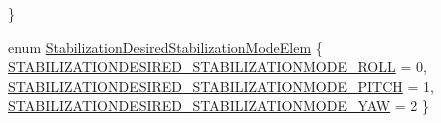 \begin{DoxyCompactItemize}
 \}
\item 
enum \hyperlink{group___stabilization_desired_gab5327ad9058cb809514e48b3600d11df}{\-Stabilization\-Desired\-Stabilization\-Mode\-Elem} \{ \hyperlink{group___stabilization_desired_ggab5327ad9058cb809514e48b3600d11dfac296a07cf1e3e0924fd303dded354d1f}{\-S\-T\-A\-B\-I\-L\-I\-Z\-A\-T\-I\-O\-N\-D\-E\-S\-I\-R\-E\-D\-\_\-\-S\-T\-A\-B\-I\-L\-I\-Z\-A\-T\-I\-O\-N\-M\-O\-D\-E\-\_\-\-R\-O\-L\-L} = 0, 
\hyperlink{group___stabilization_desired_ggab5327ad9058cb809514e48b3600d11dfac67615e86ed9b3abe51603a73becc57b}{\-S\-T\-A\-B\-I\-L\-I\-Z\-A\-T\-I\-O\-N\-D\-E\-S\-I\-R\-E\-D\-\_\-\-S\-T\-A\-B\-I\-L\-I\-Z\-A\-T\-I\-O\-N\-M\-O\-D\-E\-\_\-\-P\-I\-T\-C\-H} = 1, 
\hyperlink{group___stabilization_desired_ggab5327ad9058cb809514e48b3600d11dfa8792160d4d77aac7180a4e46507160a7}{\-S\-T\-A\-B\-I\-L\-I\-Z\-A\-T\-I\-O\-N\-D\-E\-S\-I\-R\-E\-D\-\_\-\-S\-T\-A\-B\-I\-L\-I\-Z\-A\-T\-I\-O\-N\-M\-O\-D\-E\-\_\-\-Y\-A\-W} = 2
 \}
\end{DoxyCompactItemize}
